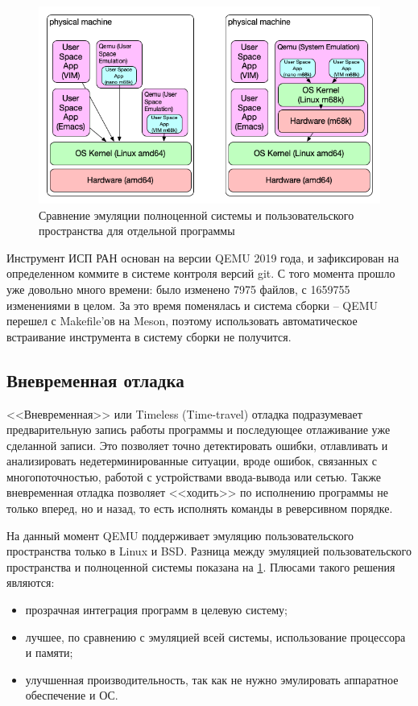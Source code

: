 \begin{figure}[!htbp]
    \centering
    \begin{adjustbox}{max totalsize={0.8\textwidth}{\textheight}}
        \includegraphics[]{images/qemu-userspace.png}
    \end{adjustbox}
    \caption{Сравнение эмуляции полноценной системы и пользовательского пространства для отдельной программы}\label{fig:qemu-userspace}
\end{figure}

Инструмент ИСП РАН основан на версии QEMU 2019 года, и зафиксирован на определенном коммите в системе
контроля версий git. С того момента прошло уже довольно много времени: было изменено 7975 файлов, с 1659755 изменениями в целом.
За это время поменялась и система сборки -- QEMU перешел с Makefile'ов на Meson, поэтому
использовать автоматическое встраивание инструмента в систему сборки не получится.

\subsection*{Вневременная отладка}\label{sec:ch1/sec2/sub1}

<<Вневременная>> или Timeless (Time-travel) отладка подразумевает предварительную запись работы программы и
последующее отлаживание уже сделанной записи. Это позволяет точно детектировать ошибки, отлавливать и
анализировать недетерминированные ситуации, вроде ошибок, связанных с многопоточностью, работой с
устройствами ввода-вывода или сетью. Также вневременная отладка позволяет <<ходить>> по исполнению
программы не только вперед, но и назад, то есть исполнять команды в реверсивном порядке.

На данный момент QEMU поддерживает эмуляцию пользовательского пространства только в Linux и BSD.
Разница между эмуляцией пользовательского пространства и полноценной системы показана на 
\cref{fig:qemu-userspace}.
Плюсами такого решения являются:
\begin{itemize}
    \item прозрачная интеграция программ в целевую систему;
    \item лучшее, по сравнению с эмуляцией всей системы, использование процессора и памяти;
    \item улучшенная производительность, так как не нужно эмулировать аппаратное обеспечение и ОС.
\end{itemize}


